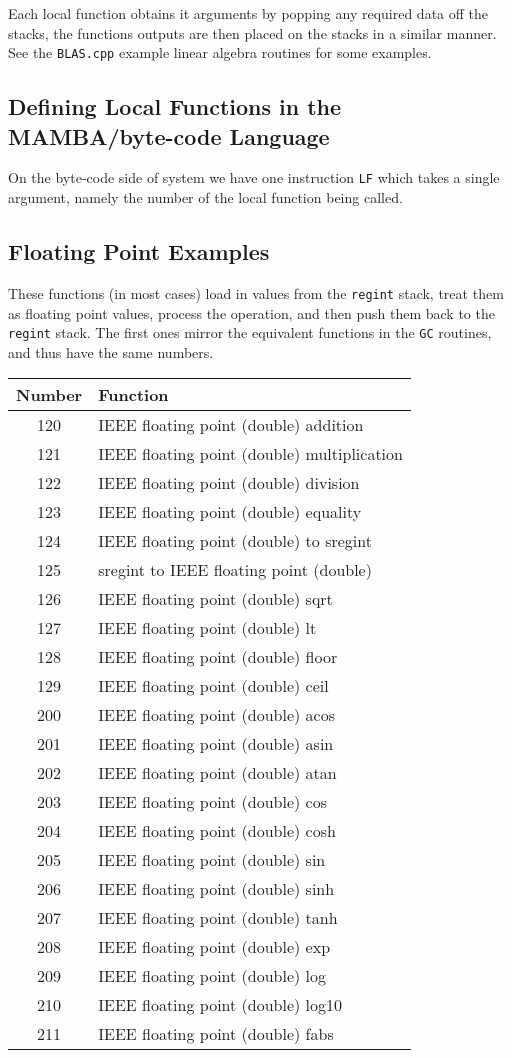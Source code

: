 Each local function obtains it arguments by popping any required
data off the stacks, the functions outputs are then placed on the
stacks in a similar manner.
See the \verb|BLAS.cpp| example linear algebra routines for
some examples.

\subsection{Defining Local Functions in the MAMBA/byte-code Language} 
On the byte-code side of system we have one instruction
\verb|LF| which takes a single argument, namely the
number of the local function being called.

\subsection{Floating Point Examples}
These functions (in most cases) load in values from the 
\verb|regint| stack, treat them as floating point values, 
process the operation, and then push them back to the \verb|regint| 
stack.
The first ones mirror the equivalent functions in the
\verb|GC| routines, and thus have the same numbers.
\begin{center}
\begin{tabular}{c|l}
Number & Function \\
\hline
120 & IEEE floating point (double) addition \\
121 & IEEE floating point (double) multiplication \\
122 & IEEE floating point (double) division \\
123 & IEEE floating point (double) equality \\
124 & IEEE floating point (double) to sregint \\
125 & sregint to IEEE floating point (double) \\
126 & IEEE floating point (double) sqrt \\
127 & IEEE floating point (double) lt \\
128 & IEEE floating point (double) floor \\
129 & IEEE floating point (double) ceil \\
\hline
200 & IEEE floating point (double) acos \\
201 & IEEE floating point (double) asin \\
202 & IEEE floating point (double) atan \\
203 & IEEE floating point (double) cos \\
204 & IEEE floating point (double) cosh \\
205 & IEEE floating point (double) sin \\
206 & IEEE floating point (double) sinh \\
207 & IEEE floating point (double) tanh \\
208 & IEEE floating point (double) exp \\
209 & IEEE floating point (double) log \\
210 & IEEE floating point (double) log10 \\
211 & IEEE floating point (double) fabs \\
\hline
\end{tabular}
\end{center}

